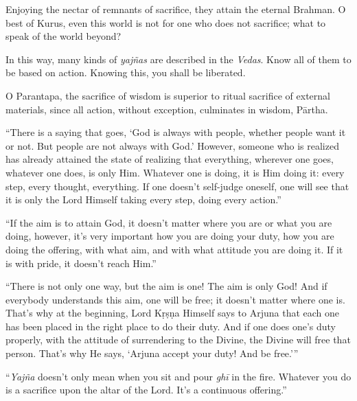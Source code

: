 {Enjoying the nectar of remnants of sacrifice, they attain the eternal Brahman. O best of Kurus, even this world is not for one who does not sacrifice; what to speak of the world beyond?}

{In this way, many kinds of \textit{yajñas} are described in the \textit{Vedas}. Know all of them to be based on action. Knowing this, you shall be liberated.}

{O Parantapa, the sacrifice of wisdom is superior to ritual sacrifice of external materials, since all action, without exception, culminates in wisdom, Pārtha.}

\enquote{There is a saying that goes, \enquote{God is always with people, whether people want it or not. But people are not always with God.} However, someone who is realized has already attained the state of realizing that everything, wherever one goes, whatever one does, is only Him. Whatever one is doing, it is Him doing it: every step, every thought, everything. If one doesn’t self-judge oneself, one will see that it is only the Lord Himself taking every step, doing every action.}

\enquote{If the aim is to attain God, it doesn’t matter where you are or what you are doing, however, it’s very important how you are doing your duty, how you are doing the offering, with what aim, and with what attitude you are doing it. If it is with pride, it doesn’t reach Him.}

\enquote{There is not only one way, but the aim is one! The aim is only God! And if everybody understands this aim, one will be free; it doesn’t matter where one is. That’s why at the beginning, Lord Kṛṣṇa Himself says to Arjuna that each one has been placed in the right place to do their duty. And if one does one’s duty properly, with the attitude of surrendering to the Divine, the Divine will free that person. That’s why He says, \enquote{Arjuna accept your duty! And be free.}}

\enquote{\textit{Yajña} doesn’t only mean when you sit and pour \textit{ghī} in the fire. Whatever you do is a sacrifice upon the altar of the Lord. It’s a continuous offering.}

